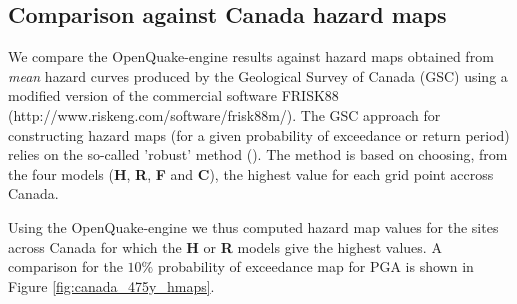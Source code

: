 \subsection{Comparison against Canada hazard maps}
We compare the OpenQuake-engine results against hazard maps obtained from \textit{mean} hazard curves produced by the Geological Survey of Canada (GSC) using a modified version of the commercial software FRISK88 (http://www.riskeng.com/software/frisk88m/). The GSC approach for constructing hazard maps (for a given probability of exceedance or return period) relies on the so-called 'robust' method (\cite{adams2003}). The method is based on choosing, from the four models (\textbf{H}, \textbf{R}, \textbf{F} and \textbf{C}), the highest value for each grid point accross Canada.

Using the OpenQuake-engine we thus computed hazard map values for the sites across Canada for which the \textbf{H} or \textbf{R} models give the highest values. A comparison for the $10\%$ probability of exceedance map for PGA is shown in Figure \ref{fig:canada_475y_hmaps}.
